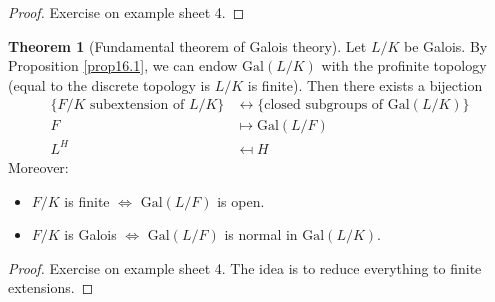 \documentclass{article}
\theoremstyle{definition}
\newtheorem{theorem}{Theorem}[section]
\begin{document}
\begin{proof}
    Exercise on example sheet 4.
\end{proof}
\begin{theorem}[Fundamental theorem of Galois theory]
    Let $L/K$ be Galois. By Proposition \ref{prop16.1}, we can endow $\text{Gal}(L/K)$ with the profinite topology (equal to the discrete topology is $L/K$ is finite). Then there exists a bijection 
    \begin{align*}
        \{F/K \text{ subextension of }L/K\} &\leftrightarrow \{\text{closed subgroups of }\text{Gal}(L/K)\}\\
        F &\mapsto \text{Gal}(L/F)\\
        L^H &\mapsfrom H
    \end{align*}
    Moreover:
    \begin{itemize}
        \item $F/K$ is finite $\iff$ $\text{Gal}(L/F)$ is open.
        \item $F/K$ is Galois $\iff$ $\text{Gal}(L/F)$ is normal in $\text{Gal}(L/K)$.
    \end{itemize}
\end{theorem}
\begin{proof}
    Exercise on example sheet 4. The idea is to reduce everything to finite extensions.
\end{proof}
\end{document}
